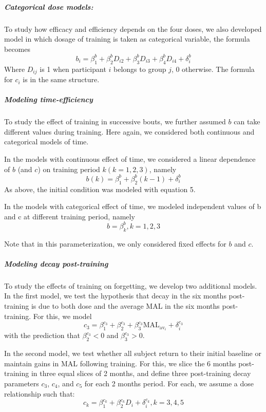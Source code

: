 \subparagraph{Categorical dose models: } 
To study how efficacy and efficiency depends on the four doses, we also developed model in which dosage of training is taken as categorical variable, the formula becomes
\begin{equation}
	b_i = \beta_1^b + \beta_2^b D_{i2} + \beta_3^b D_{i3} + \beta_4^b D_{i4} + \delta_i^b
\end{equation}
Where $ D_{ij} $ is 1 when participant $ i $ belongs to group $ j $, 0 otherwise. 
The formula for $ c_i $ is in the same structure.

\subparagraph{Modeling time-efficiency}
To study the effect of training in successive bouts, we further assumed $ b $ can take different values during training. 
Here again, we considered both continuous and categorical models of time.

In the models with continuous effect of time, we considered a linear dependence of $ b $ (and $ c $) on training period $ k (k=1,2,3) $, namely
\begin{equation}\label{eqn:timingcat}
	b(k) = \beta_1^b + \beta_2^b (k-1) + \delta_i^b
\end{equation}
As above, the initial condition was modeled with equation 5.  

In the models with categorical effect of time, we modeled independent values of b and c at different training period, namely
\begin{equation}
	b = \beta_k^b,  k = 1,2,3
\end{equation}

Note that in this parameterization, we only considered fixed effects for $ b $ and $ c $.

\subparagraph{Modeling decay post-training}
To study the effects of training on forgetting, we develop two additional models. 
In the first model, we test the hypothesis that decay in the six months post-training is due to both dose and the average MAL in the six months post-training. 
For this, we model 
\begin{equation}
	c_3 = \beta_1^{c_3} + \beta_2^{c_3} + \beta_3^{c_3}\text{MAL}_{\text{av}_i} + \delta_i^{c_3}
\end{equation}
with the prediction that $ \beta_2^{c_3} < 0 $ and $ \beta_3^{c_3} > 0 $.

In the second model, we test whether all subject return to their initial baseline or maintain gains in MAL following training.
For this, we slice the 6 months post-training in three equal slices of 2 months, and define three post-training decay parameters $ c_3 $, $ c_4 $, and $ c_5 $ for each 2 months period. 
For each, we assume a dose relationship such that: 
\begin{equation}
	c_k = \beta_1^{c_k} + \beta_2^{c_k} D_i + \delta_i^{c_k}, k = 3,4,5
\end{equation}

